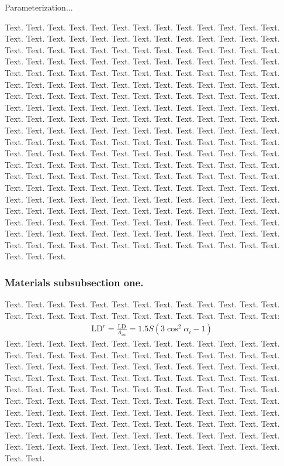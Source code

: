 \documentclass[a4,center,fleqn]{NAR}
\begin{document}
Parameterization... 

Text. Text. Text. Text. Text. Text. Text. Text. Text. Text. Text.
Text. Text. Text. Text. Text. Text. Text. Text. Text. Text. Text.
Text. Text. Text. Text. Text. Text. Text. Text. Text. Text. Text.
Text. Text. Text. Text. Text. Text. Text. Text. Text. Text. Text.
Text. Text. Text. Text. Text. Text. Text. Text. Text. Text. Text.
Text. Text. Text. Text. Text. Text. Text. Text. Text. Text. Text.
Text. Text. Text. Text. Text. Text. Text. Text. Text. Text. Text.
Text. Text. Text. Text. Text. Text. Text. Text. Text. Text. Text.
Text. Text. Text. Text. Text. Text. Text. Text. Text. Text. Text.
Text. Text. Text. Text. Text. Text. Text. Text. Text. Text. Text.
Text. Text. Text. Text. Text. Text. Text. Text. Text. Text. Text.
Text. Text. Text. Text. Text. Text. Text. Text. Text. Text. Text.
Text. Text. Text. Text. Text. Text. Text. Text. Text. Text. Text.
Text. Text. Text. Text. Text. Text. Text. Text. Text. Text. Text.
Text. Text. Text. Text. Text. Text. Text. Text. Text. Text. Text.
Text. Text. Text. Text. Text. Text. Text. Text. Text. Text. Text.
Text. Text. Text. Text. Text. Text. Text. Text. Text. Text. Text.
Text. Text. Text. Text. Text. Text. Text. Text. Text. Text. Text.
Text. Text. Text. Text. Text. Text. Text. Text. Text. Text. Text.
Text. Text. Text. Text. Text. Text. Text. Text. Text. Text. Text.
Text. Text. Text. Text. Text. Text. Text. Text. Text. Text. Text.
Text. Text. Text. Text. Text. Text. Text. Text. Text. Text. Text.
Text. Text. Text. Text. Text. Text. Text. Text. Text. Text. Text.
Text. Text. Text. Text. Text. Text. Text. Text. Text. Text.


\subsubsection{Materials subsubsection one.}

Text. Text. Text. Text. Text. Text. Text. Text. Text. Text. Text.
Text. Text. Text. Text. Text. Text. Text. Text. Text. Text. Text.
Text. Text. Text. Text:
\begin{align}
\mathrm{LD}^r = \frac{\mathrm{LD}}{A_\mathrm{iso}}
= 1.5 S \left( 3 \cos^2 \alpha_i - 1 \right)
\end{align}
Text. Text. Text. Text. Text. Text. Text. Text. Text. Text. Text.
Text. Text. Text. Text. Text. Text. Text. Text. Text. Text. Text.
Text. Text. Text. Text. Text. Text. Text. Text. Text. Text. Text.
Text. Text. Text. Text. Text. Text. Text. Text. Text. Text. Text.
Text. Text. Text. Text. Text. Text. Text. Text. Text. Text. Text.
Text. Text. Text. Text. Text. Text. Text. Text. Text. Text. Text.
Text. Text. Text. Text. Text. Text. Text. Text. Text. Text. Text.
Text. Text. Text. Text. Text. Text. Text. Text. Text. Text. Text.
Text. Text. Text. Text. Text. Text. Text. Text. Text. Text. Text.
Text. Text. Text. Text. Text. Text. Text. Text. Text. Text. Text.
Text. Text. Text. Text. Text. Text. Text. Text. Text. Text. Text.
Text. Text. Text. Text. Text. Text. Text. Text. Text. Text. Text.
\end{document}
